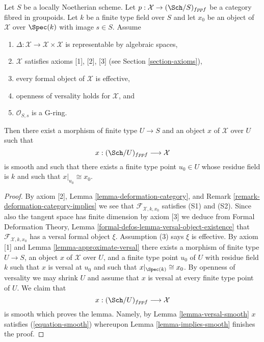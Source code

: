 \begin{lemma}
\label{lemma-get-smooth}
Let $S$ be a locally Noetherian scheme. Let
$p : \mathcal{X} \to (\Sch/S)_{fppf}$ be a category fibred in groupoids.
Let $k$ be a finite type field over $S$ and let $x_0$ be an object of
$\mathcal{X}$ over $\Spec(k)$ with image $s \in S$. Assume
\begin{enumerate}
\item $\Delta : \mathcal{X} \to \mathcal{X} \times \mathcal{X}$ is
representable by algebraic spaces,
\item $\mathcal{X}$ satisfies axioms [1], [2], [3] (see
Section \ref{section-axioms}),
\item every formal object of $\mathcal{X}$ is effective,
\item openness of versality holds for $\mathcal{X}$, and
\item $\mathcal{O}_{S, s}$ is a G-ring.
\end{enumerate}
Then there exist a morphism of finite type $U \to S$ and an object
$x$ of $\mathcal{X}$ over $U$ such that
$$
x : (\Sch/U)_{fppf} \longrightarrow \mathcal{X}
$$
is smooth and such that there exists a finite type point $u_0 \in U$
whose residue field is $k$ and such that $x|_{u_0} \cong x_0$.
\end{lemma}

\begin{proof}
By axiom [2], Lemma \ref{lemma-deformation-category}, and
Remark \ref{remark-deformation-category-implies}
we see that $\mathcal{F}_{\mathcal{X}, k, x_0}$ satisfies (S1) and (S2).
Since also the tangent space has finite dimension by axiom [3]
we deduce from Formal Deformation Theory, Lemma
\ref{formal-defos-lemma-versal-object-existence}
that $\mathcal{F}_{\mathcal{X}, k, x_0}$ has a versal formal object $\xi$.
Assumption (3) says $\xi$ is effective. By axiom [1] and
Lemma \ref{lemma-approximate-versal}
there exists a morphism of finite type $U \to S$, an object $x$ of
$\mathcal{X}$ over $U$, and a finite type point $u_0$ of $U$ with residue
field $k$ such that $x$ is versal at $u_0$ and such that
$x|_{\Spec(k)} \cong x_0$. By openness of versality we may shrink
$U$ and assume that $x$ is versal at every finite type point of $U$.
We claim that
$$
x : (\Sch/U)_{fppf} \longrightarrow \mathcal{X}
$$
is smooth which proves the lemma. Namely, by Lemma \ref{lemma-versal-smooth}
$x$ satisfies (\ref{equation-smooth})
whereupon Lemma \ref{lemma-implies-smooth}
finishes the proof.
\end{proof}






